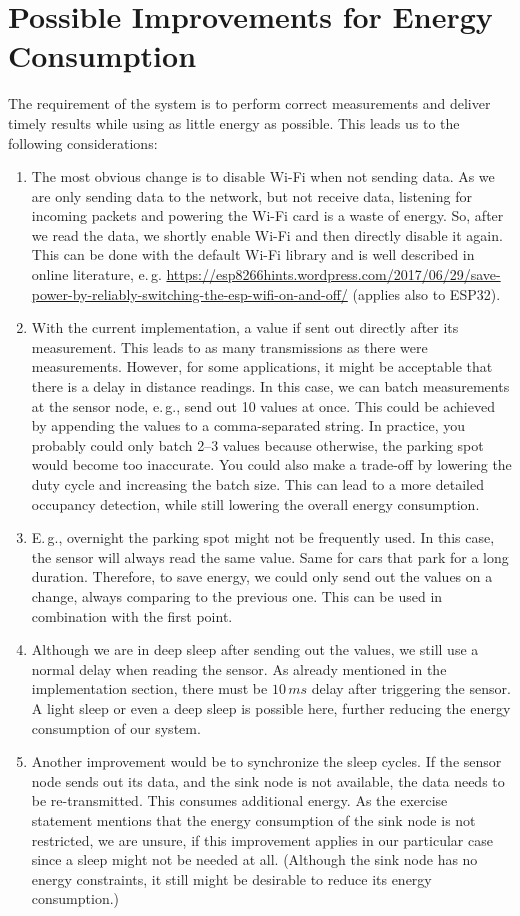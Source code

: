 \documentclass{article}
\begin{document}
\section{Possible Improvements for Energy Consumption}
The requirement of the system is to perform correct measurements and deliver timely results while using as little energy as possible. This leads us to the following considerations:
\begin{enumerate}
    \item The most obvious change is to disable Wi-Fi when not sending data. As we are only sending data to the network, but not receive data, listening for incoming packets and powering the Wi-Fi card is a waste of energy. So, after we read the data, we shortly enable Wi-Fi and then directly disable it again.
    This can be done with the default Wi-Fi library and is well described in online literature, e.\,g. \url{https://esp8266hints.wordpress.com/2017/06/29/save-power-by-reliably-switching-the-esp-wifi-on-and-off/} (applies also to ESP32).
    \item With the current implementation, a value if sent out directly after its measurement. This leads to as many transmissions as there were measurements. However, for some applications, it might be acceptable that there is a delay in distance readings. In this case, we can batch measurements at the sensor node, e.\,g., send out 10 values at once. This could be achieved by appending the values to a comma-separated string. In practice, you probably could only batch 2–3 values because otherwise, the parking spot would become too inaccurate. You could also make a trade-off by lowering the duty cycle and increasing the batch size. This can lead to a more detailed occupancy detection, while still lowering the overall energy consumption.
    \item E.\,g., overnight the parking spot might not be frequently used. In this case, the sensor will always read the same value. Same for cars that park for a long duration. Therefore, to save energy, we could only send out the values on a change, always comparing to the previous one. This can be used in combination with the first point.
    \item Although we are in deep sleep after sending out the values, we still use a normal delay when reading the sensor. As already mentioned in the implementation section, there must be $10\,ms$ delay after triggering the sensor. A light sleep or even a deep sleep is possible here, further reducing the energy consumption of our system. 
    \item Another improvement would be to synchronize the sleep cycles. If the sensor node sends out its data, and the sink node is not available, the data needs to be re-transmitted. This consumes additional energy. As the exercise statement mentions that the energy consumption of the sink node is not restricted, we are unsure, if this improvement applies in our particular case since a sleep might not be needed at all. (Although the sink node has no energy constraints, it still might be desirable to reduce its energy consumption.)
\end{enumerate}
\end{document}
